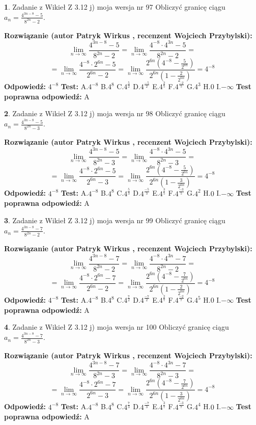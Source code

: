 \documentclass[12pt, a4paper]{article}
\theoremstyle{definition} %
\newtheorem{zad}{}
\newcommand{\zadStart}[1]{\begin{zad}#1\newline}
\newcommand{\zadStop}{\end{zad}}
\newcommand{\rozwStart}[2]{\noindent \textbf{Rozwiązanie (autor #1 , recenzent #2): }\newline}
\newcommand{\rozwStop}{\newline}
\newcommand{\odpStart}{\noindent \textbf{Odpowiedź:}\newline}
\newcommand{\odpStop}{\newline}
\newcommand{\testStart}{\noindent \textbf{Test:}\newline}
\newcommand{\testStop}{\newline}
\newcommand{\kluczStart}{\noindent \textbf{Test poprawna odpowiedź:}\newline}
\newcommand{\kluczStop}{\newline}
\begin{document}
\zadStart{Zadanie z Wikieł Z 3.12 j) moja wersja nr 97}
Obliczyć granicę ciągu $a_{n}=\frac{4^{3n-8}-5}{8^{2n}-2}$.
\zadStop
\rozwStart{Patryk Wirkus}{Wojciech Przybylski}
$$\lim\limits_{n\to\infty}\frac{4^{3n-8}-5}{8^{2n}-2}= \lim\limits_{n\to\infty}\frac{4^{-8} \cdot 4^{3n}-5}{8^{2n}-2}=$$
$$= \lim\limits_{n\to\infty}\frac{4^{-8} \cdot 2^{6n}-5}{2^{6n}-2}= \lim\limits_{n\to\infty}\frac{2^{6n}(4^{-8} - \frac{5}{2^{6n}})}{2^{6n}(1-\frac{2}{2^{6n}})}= 4^{-8}$$
\rozwStop
\odpStart
$4^{-8}$
\odpStop
\testStart
A.$4^{-8}$
B.$4^{8}$
C.$4^{\frac{5}{2}}$
D.$4^{\frac{-5}{2}}$
E.$4^{\frac{2}{5}}$
F.$4^{\frac{-2}{5}}$
G.$4^{3}$
H.$0$
I.$-\infty$
\testStop
\kluczStart
A
\kluczStop



\zadStart{Zadanie z Wikieł Z 3.12 j) moja wersja nr 98}
Obliczyć granicę ciągu $a_{n}=\frac{4^{3n-8}-5}{8^{2n}-3}$.
\zadStop
\rozwStart{Patryk Wirkus}{Wojciech Przybylski}
$$\lim\limits_{n\to\infty}\frac{4^{3n-8}-5}{8^{2n}-3}= \lim\limits_{n\to\infty}\frac{4^{-8} \cdot 4^{3n}-5}{8^{2n}-3}=$$
$$= \lim\limits_{n\to\infty}\frac{4^{-8} \cdot 2^{6n}-5}{2^{6n}-3}= \lim\limits_{n\to\infty}\frac{2^{6n}(4^{-8} - \frac{5}{2^{6n}})}{2^{6n}(1-\frac{3}{2^{6n}})}= 4^{-8}$$
\rozwStop
\odpStart
$4^{-8}$
\odpStop
\testStart
A.$4^{-8}$
B.$4^{8}$
C.$4^{\frac{5}{3}}$
D.$4^{\frac{-5}{3}}$
E.$4^{\frac{3}{5}}$
F.$4^{\frac{-3}{5}}$
G.$4^{2}$
H.$0$
I.$-\infty$
\testStop
\kluczStart
A
\kluczStop



\zadStart{Zadanie z Wikieł Z 3.12 j) moja wersja nr 99}
Obliczyć granicę ciągu $a_{n}=\frac{4^{3n-8}-7}{8^{2n}-2}$.
\zadStop
\rozwStart{Patryk Wirkus}{Wojciech Przybylski}
$$\lim\limits_{n\to\infty}\frac{4^{3n-8}-7}{8^{2n}-2}= \lim\limits_{n\to\infty}\frac{4^{-8} \cdot 4^{3n}-7}{8^{2n}-2}=$$
$$= \lim\limits_{n\to\infty}\frac{4^{-8} \cdot 2^{6n}-7}{2^{6n}-2}= \lim\limits_{n\to\infty}\frac{2^{6n}(4^{-8} - \frac{7}{2^{6n}})}{2^{6n}(1-\frac{2}{2^{6n}})}= 4^{-8}$$
\rozwStop
\odpStart
$4^{-8}$
\odpStop
\testStart
A.$4^{-8}$
B.$4^{8}$
C.$4^{\frac{7}{2}}$
D.$4^{\frac{-7}{2}}$
E.$4^{\frac{2}{7}}$
F.$4^{\frac{-2}{7}}$
G.$4^{5}$
H.$0$
I.$-\infty$
\testStop
\kluczStart
A
\kluczStop



\zadStart{Zadanie z Wikieł Z 3.12 j) moja wersja nr 100}
Obliczyć granicę ciągu $a_{n}=\frac{4^{3n-8}-7}{8^{2n}-3}$.
\zadStop
\rozwStart{Patryk Wirkus}{Wojciech Przybylski}
$$\lim\limits_{n\to\infty}\frac{4^{3n-8}-7}{8^{2n}-3}= \lim\limits_{n\to\infty}\frac{4^{-8} \cdot 4^{3n}-7}{8^{2n}-3}=$$
$$= \lim\limits_{n\to\infty}\frac{4^{-8} \cdot 2^{6n}-7}{2^{6n}-3}= \lim\limits_{n\to\infty}\frac{2^{6n}(4^{-8} - \frac{7}{2^{6n}})}{2^{6n}(1-\frac{3}{2^{6n}})}= 4^{-8}$$
\rozwStop
\odpStart
$4^{-8}$
\odpStop
\testStart
A.$4^{-8}$
B.$4^{8}$
C.$4^{\frac{7}{3}}$
D.$4^{\frac{-7}{3}}$
E.$4^{\frac{3}{7}}$
F.$4^{\frac{-3}{7}}$
G.$4^{4}$
H.$0$
I.$-\infty$
\testStop
\kluczStart
A
\kluczStop
\end{document}
